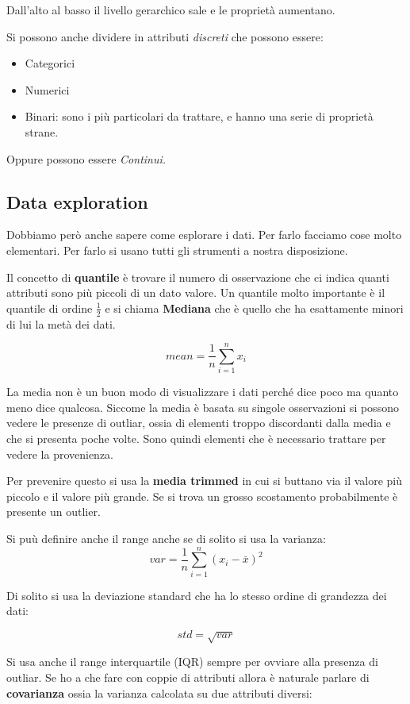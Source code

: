 Dall'alto al basso il livello gerarchico sale e le proprietà aumentano.

Si possono anche dividere in attributi \textit{discreti} che possono essere:
\begin{itemize}
	\item Categorici
	\item Numerici
	\item Binari: sono i più particolari da trattare, e hanno una serie di proprietà strane.
\end{itemize}
Oppure possono essere \textit{Continui.}

\subsection{Data exploration}

Dobbiamo però anche sapere come esplorare i dati. Per farlo facciamo cose molto elementari.
Per farlo si usano tutti gli strumenti a nostra disposizione.

Il concetto di \textbf{quantile} è trovare il numero di osservazione che ci indica quanti attributi sono più piccoli di un dato valore.
Un quantile molto importante è il quantile di ordine $\frac{1}{2}$ e si chiama \textbf{Mediana} che è quello che ha esattamente minori di lui la metà dei dati.

\[mean = \frac{1}{n}\sum_{i=1}^{n}x_i\]

La media non è un buon modo di visualizzare i dati perché dice poco ma quanto meno dice qualcosa. Siccome la media è basata su singole osservazioni si possono vedere le presenze di outliar, ossia di elementi troppo discordanti dalla media e che si presenta poche volte. Sono quindi elementi che è necessario trattare per vedere la provenienza.

Per prevenire questo si usa la \textbf{media trimmed} in cui si buttano via il valore più piccolo e il valore più grande. Se si trova un grosso scostamento probabilmente è presente un outlier.

Si puù definire anche il range anche se di solito si usa la varianza:
\[var = \frac{1}{n}\sum_{i = 1}^{n} (x_{i} - \bar{x})^{2}\]

Di solito si usa la deviazione standard che ha lo stesso ordine di grandezza dei dati:

\[ std = \sqrt{var} \]

Si usa anche il range interquartile (IQR) sempre per ovviare alla presenza di outliar.
Se ho a che fare con coppie di attributi allora è naturale parlare di \textbf{covarianza} ossia la varianza calcolata su due attributi diversi:

